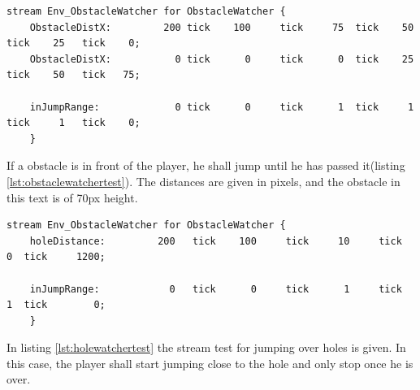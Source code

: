 \begin{lstlisting}[label=lst:obstaclewatchertest, caption=Obstacle watcher stream test, morekeywords={},
frame=single, basicstyle=\tiny]
stream Env_ObstacleWatcher for ObstacleWatcher {
    ObstacleDistX:         200 tick    100     tick		75	tick	50	tick 	25   tick	 0;
    ObstacleDistX:           0 tick      0     tick      0	tick	25	tick 	50	 tick	75;
    
    inJumpRange:          	 0 tick      0     tick      1	tick	 1	tick	 1	 tick	 0;
    }
\end{lstlisting}
If a obstacle is in front of the player, he shall jump until he has passed it(listing \ref{lst:obstaclewatchertest}). The distances are given in pixels, and the obstacle in this text is of 70px height.

\begin{lstlisting}[label=lst:holewatchertest, caption=Hole watcher stream test, morekeywords={},
frame=single, basicstyle=\tiny]
stream Env_ObstacleWatcher for ObstacleWatcher {
    holeDistance:         200 	tick    100     tick     10 	tick     0 	tick     1200;
    
    inJumpRange:            0 	tick      0     tick      1		tick	 1  tick		0;
    }
\end{lstlisting}

In listing \ref{lst:holewatchertest} the stream test for jumping over holes is given. In this case, the player shall start jumping close to the hole and only stop once he is over.


